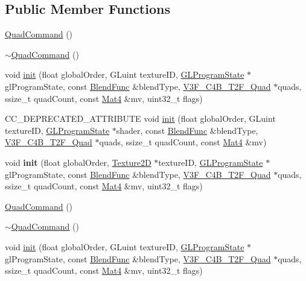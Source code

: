 \subsection*{Public Member Functions}
\begin{DoxyCompactItemize}
\item 
\hyperlink{classQuadCommand_a54d0771b603ab1c094405d093d625f7b}{Quad\+Command} ()
\item 
\hyperlink{classQuadCommand_a62011bf2a8dec788dde157279fba7eba}{$\sim$\+Quad\+Command} ()
\item 
void \hyperlink{classQuadCommand_a62fd14758cf62ebf67f3bd2e0e3d3999}{init} (float global\+Order, G\+Luint texture\+ID, \hyperlink{classGLProgramState}{G\+L\+Program\+State} $\ast$gl\+Program\+State, const \hyperlink{structBlendFunc}{Blend\+Func} \&blend\+Type, \hyperlink{structV3F__C4B__T2F__Quad}{V3\+F\+\_\+\+C4\+B\+\_\+\+T2\+F\+\_\+\+Quad} $\ast$quads, ssize\+\_\+t quad\+Count, const \hyperlink{classMat4}{Mat4} \&mv, uint32\+\_\+t flags)
\item 
C\+C\+\_\+\+D\+E\+P\+R\+E\+C\+A\+T\+E\+D\+\_\+\+A\+T\+T\+R\+I\+B\+U\+TE void \hyperlink{classQuadCommand_a7ee61037bdd84b550526178769c26b20}{init} (float global\+Order, G\+Luint texture\+ID, \hyperlink{classGLProgramState}{G\+L\+Program\+State} $\ast$shader, const \hyperlink{structBlendFunc}{Blend\+Func} \&blend\+Type, \hyperlink{structV3F__C4B__T2F__Quad}{V3\+F\+\_\+\+C4\+B\+\_\+\+T2\+F\+\_\+\+Quad} $\ast$quads, ssize\+\_\+t quad\+Count, const \hyperlink{classMat4}{Mat4} \&mv)
\item 
\mbox{\label{classQuadCommand_a1606b3525771b9cb36559e1423da2428}} 
void {\bfseries init} (float global\+Order, \hyperlink{classTexture2D}{Texture2D} $\ast$texture\+ID, \hyperlink{classGLProgramState}{G\+L\+Program\+State} $\ast$gl\+Program\+State, const \hyperlink{structBlendFunc}{Blend\+Func} \&blend\+Type, \hyperlink{structV3F__C4B__T2F__Quad}{V3\+F\+\_\+\+C4\+B\+\_\+\+T2\+F\+\_\+\+Quad} $\ast$quads, ssize\+\_\+t quad\+Count, const \hyperlink{classMat4}{Mat4} \&mv, uint32\+\_\+t flags)
\item 
\hyperlink{classQuadCommand_a54d0771b603ab1c094405d093d625f7b}{Quad\+Command} ()
\item 
\hyperlink{classQuadCommand_a62011bf2a8dec788dde157279fba7eba}{$\sim$\+Quad\+Command} ()
\item 
void \hyperlink{classQuadCommand_a62fd14758cf62ebf67f3bd2e0e3d3999}{init} (float global\+Order, G\+Luint texture\+ID, \hyperlink{classGLProgramState}{G\+L\+Program\+State} $\ast$gl\+Program\+State, const \hyperlink{structBlendFunc}{Blend\+Func} \&blend\+Type, \hyperlink{structV3F__C4B__T2F__Quad}{V3\+F\+\_\+\+C4\+B\+\_\+\+T2\+F\+\_\+\+Quad} $\ast$quads, ssize\+\_\+t quad\+Count, const \hyperlink{classMat4}{Mat4} \&mv, uint32\+\_\+t flags)

\end{DoxyCompactItemize}

